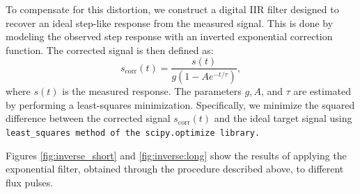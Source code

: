 To compensate for this distortion, we construct a digital IIR filter designed to recover an ideal step-like response from the measured signal. 
This is done by modeling the observed step response with an inverted exponential correction function. The corrected signal is then defined as:
\begin{equation}\label{eq:inverse}
s_{\text{corr}}(t) = \frac{s(t)}{g(1 - Ae^{-t/\tau})},
\end{equation}
where $s(t)$ is the measured response. 
The parameters $g, A$, and $\tau$  are estimated by performing a least-squares minimization. 
Specifically, we minimize the squared difference between the corrected signal $s_{\text{corr}}(t)$ and the ideal target signal using \tt{least\_squares} method of the \tt{scipy.optimize} library.

Figures \ref{fig:inverse_short} and \ref{fig:inverse:long} show the results of applying the exponential filter, obtained through the procedure described above, to different flux pulses.

